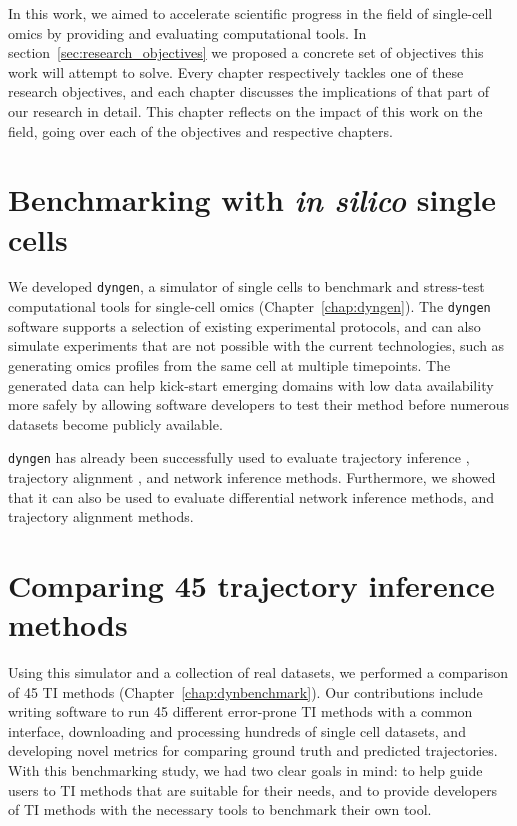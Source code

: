 

In this work, we aimed to accelerate scientific progress in the field of single-cell omics by providing and evaluating computational tools. In section~\ref{sec:research_objectives} we proposed a concrete set of objectives this work will attempt to solve. Every chapter respectively tackles one of these research objectives, and each chapter discusses the implications of that part of our research in detail. This chapter reflects on the impact of this work on the field, going over each of the objectives and respective chapters. 

\section{Benchmarking with \textit{in silico} single cells}

We developed \texttt{dyngen}, a simulator of single cells to benchmark and stress-test computational tools for single-cell omics (Chapter~\ref{chap:dyngen}).
The \texttt{dyngen} software supports a selection of existing experimental protocols, and can also simulate experiments that are not possible with the current technologies, such as generating omics profiles from the same cell at multiple timepoints.
The generated data can help kick-start emerging domains with low data availability more safely by allowing software developers to test their method before numerous datasets become publicly available.

\texttt{dyngen} has already been successfully used to evaluate trajectory inference \cite{saelens_comparisonsinglecelltrajectory_2019}, trajectory alignment \cite{vandenberge_trajectorybaseddifferentialexpression_2019}, and network inference \cite{pratapa_benchmarkingalgorithmsgene_2019} methods. Furthermore, we showed that it can also be used to evaluate differential network inference methods, and trajectory alignment methods.




\section{Comparing 45 trajectory inference methods}
Using this simulator and a collection of real datasets, we performed a comparison of 45 TI methods (Chapter~\ref{chap:dynbenchmark}).
Our contributions include writing software to run 45 different error-prone TI methods with a common interface, downloading and processing hundreds of single cell datasets, and developing novel metrics for comparing ground truth and predicted trajectories.
With this benchmarking study, we had two clear goals in mind: to help guide users to TI methods that are suitable for their needs, and to provide developers of TI methods with the necessary tools to benchmark their own tool.

